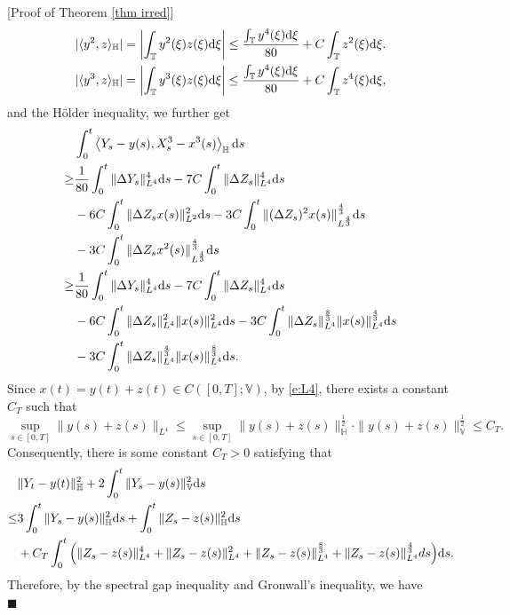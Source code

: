 \documentclass[12pt,a4paper]{article}
\theoremstyle{definition}
\theoremstyle{remark}
\numberwithin{equation}{section}
\newcommand{\Ll}{\langle}
\newcommand{\Rr}{\rangle}
\newcommand{\HH}{\mathbb{H}}
\newcommand{\VV}{\mathbb{V}}
\newcommand{\dif}{{\rm d}}
\newenvironment{proof}{\par\noindent{\bf Proof:}}{\hspace*{\fill}$\blacksquare$\par}
\begin{document}
{\begin{proof}[Proof of Theorem \ref{thm irred}]
\begin{equation}
\begin{split}
& |\Ll  y^2, z \Rr_\HH|=\left|\int_{\mathbb T} y^2(\xi) z (\xi) \dif \xi\right| \le \frac{\int_{\mathbb T} y^4(\xi) \dif \xi}{80}+C\int_{\mathbb T} z^2(\xi) \dif \xi. \\
& |\Ll  y^3, z  \Rr_\HH|=\left|\int_{\mathbb T} y^3(\xi) z(\xi) \dif \xi\right| \le \frac{ \int_{\mathbb T} y^4(\xi) \dif \xi}{80}+ C\int_{\mathbb T} z^4(\xi) \dif \xi,
\end{split}
\end{equation}
and the H\"older inequality, we further get
\begin{align*}
 &\int_{0}^t \left\Ll Y_s-y(s), X^3_s-x^3(s)\right\Rr_\HH \dif s \\
\ge&  \frac{1}{80}\int_{0}^t \|\Delta Y_s\|_{L^4}^4\dif s-7C\int_{0}^t \|\Delta Z_s\|_{L^4}^4 \dif s\\
&-6C\int_{0}^t\|\Delta Z_s x(s)\|_{L^2}^2\dif s-3C\int_{0}^t\|(\Delta Z_s)^2 x(s)\|_{L^{\frac43}}^{\frac43}\dif s\\
&-3C\int_{0}^t\|\Delta Z_s x^2(s)\|_{L^{\frac43}}^{\frac43}\dif s\\
\ge&  \frac{1}{80}\int_{0}^t \|\Delta Y_s\|_{L^4}^4\dif s-7C\int_{0}^t \|\Delta Z_s\|_{L^4}^4 \dif s\\
&-6C\int_{0}^t\|\Delta Z_s\|_{L^4}^{2}\|x(s)\|_{L^4}^{2}\dif s-3C\int_{0}^t\|\Delta Z_s\|_{L^4}^{\frac83}\|x(s)\|_{L^4}^{\frac43}\dif s\\
&-3C\int_{0}^t\|\Delta Z_s\|_{L^4}^{\frac43}\|x(s)\|_{L^4}^{\frac83}\dif s.
\end{align*}
 Since $x(t)=y(t)+z(t)\in   C([0, T]; \VV)$, by \eqref{e:L4}, there exists a constant $C_T$ such that
 $$
\sup_{s\in [0, T]} \|y(s)+z(s)\|_{L^4}\le  \sup_{s\in [0, T]}\|y(s)+z(s)\|_{\HH}^{\frac12}\cdot\|y(s)+z(s)\|_{\VV}^{\frac12}\le C_T.
 $$
Consequently,  there is some constant $C_T>0$ satisfying that
\begin{equation*}
\begin{split}
& \|Y_t-y(t)\|_{\HH}^2+2\int_{0}^t \|Y_s-y(s)\|^2_{\VV} \dif s \\
\le& 3\int_{0}^t \|Y_s-y(s)\|^2_\HH \dif s+\int_{0}^t \|Z_s-z(s)\|^2_\HH \dif s\\
& +C_T\int_{0}^t\Big( \|Z_s-z(s)\|_{L^4}^4+\|Z_s-z(s)\|_{L^4}^{2} +\|Z_s-z(s)\|_{L^4}^{\frac83} +\|Z_s-z(s)\|_{L^4}^{\frac43} ds\Big) \dif s.
 \end{split}
\end{equation*}
Therefore, by the spectral gap inequality and Gronwall's inequality, we have
\begin{equation}\label{e: Gron}
\begin{split}

\end{split}
\end{equation}
\end{proof}}
\end{document}
